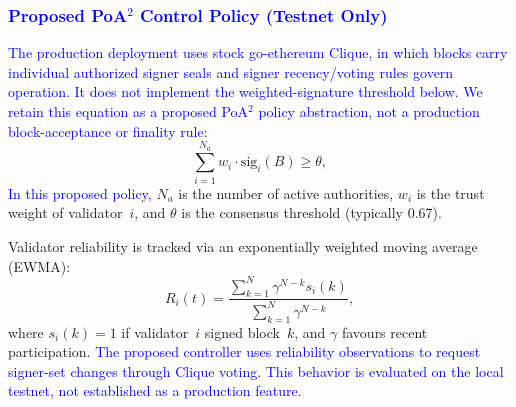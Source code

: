 \documentclass[conference]{IEEEtran}
\newcommand{\rev}[2]{\textcolor{blue}{#2}}
\begin{document}
\begin{table}[!t]
\centering
\caption{Live PureChain validator set queried at
  block~1{,}012{,}544.}
\label{tab:validators}
\end{table}

\subsubsection{\rev{R1.2, R1.3, R2.4}{Proposed PoA$^2$ Control Policy (Testnet Only)}}

\rev{R1.2, R1.3, R2.4}{The production deployment uses stock
go-ethereum Clique, in which blocks carry individual authorized
signer seals and signer recency/voting rules govern operation.
It does not implement the weighted-signature threshold below.
We retain this equation as a proposed PoA$^2$ policy abstraction,
not a production block-acceptance or finality rule:}
\begin{equation}
\label{poa}
\sum_{i=1}^{N_a} w_i \cdot \mathrm{sig}_i(B) \ge \theta,
\end{equation}
\rev{R2.4}{In this proposed policy,} $N_a$ is the number of active authorities,
$w_i$ is the trust weight of validator~$i$, and $\theta$
is the consensus threshold (typically 0.67).

Validator reliability is tracked via an exponentially
weighted moving average (EWMA):
\begin{equation}
\label{validator}
R_i(t) =
\frac{\sum_{k=1}^{N}\gamma^{N-k}s_i(k)}
     {\sum_{k=1}^{N}\gamma^{N-k}},
\end{equation}
where $s_i(k)=1$ if validator~$i$ signed block~$k$,
and $\gamma$ favours recent participation.
\rev{R1.3, R2.4}{The proposed controller uses reliability observations to request signer-set changes through Clique voting. This behavior is evaluated on the local testnet, not established as a production feature.}
\end{document}

